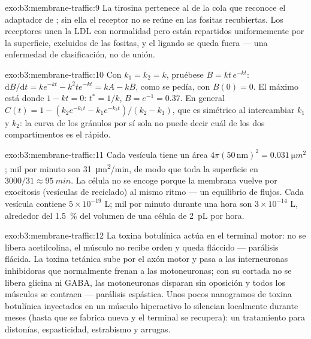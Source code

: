 \begin{solution}{exo:b3:membrane-traffic:9}
La tirosina pertenece al  de la cola que reconoce el adaptador de
; sin ella el receptor no se reúne en las fositas recubiertas.
Los receptores unen la LDL con normalidad pero están repartidos
uniformemente por la superficie, excluidos de las fositas, y el ligando
se queda fuera --- una enfermedad de clasificación, no de unión.
\end{solution}

\begin{solution}{exo:b3:membrane-traffic:10}
Con $k_{1} = k_{2} = k$, pruébese $B = kt\,e^{-kt}$: $\mathrm{d}B/\mathrm{d}t
= k e^{-kt} - k^{2}t e^{-kt} = kA - kB$, como se pedía, con $B(0) = 0$.
El máximo está donde $1 - kt = 0$: $t^{*} = 1/k$, $B = e^{-1} = 0.37$.
En general
$C(t) = 1 - (k_{2}e^{-k_{1}t} - k_{1}e^{-k_{2}t})/(k_{2} - k_{1})$,
que es simétrico al intercambiar $k_{1}$ y $k_{2}$: la curva de
los gránulos por sí sola no puede decir cuál de los dos compartimentos es
el rápido.
\end{solution}

\begin{solution}{exo:b3:membrane-traffic:11}
Cada vesícula tiene un área $4\pi(50\,\text{nm})^{2} = \qty{0.031}{\micro
m^2}$; mil por minuto son \qty{31}{\micro m^2/min}, de modo que toda la
superficie en $3000/31 \approx \qty{95}{min}$. La célula no se encoge
porque la membrana vuelve por exocitosis (vesículas de reciclado) al
mismo ritmo --- un equilibrio de flujos. Cada vesícula contiene
$5\times 10^{-19}$ L; mil por minuto durante una hora son
$3\times 10^{-14}$ L, alrededor del \qty{1.5}{\%} del volumen de una
célula de \qty{2}{pL} por hora.
\end{solution}

\begin{solution}{exo:b3:membrane-traffic:12}
La toxina botulínica actúa en el terminal motor: no se libera
acetilcolina, el músculo no recibe orden y queda fláccido --- parálisis
flácida. La toxina tetánica sube por el axón motor y pasa a las
interneuronas inhibidoras que normalmente frenan a las motoneuronas; con
su  cortada no se libera glicina ni GABA, las motoneuronas disparan
sin oposición y todos los músculos se contraen --- parálisis espástica.
Unos pocos nanogramos de toxina botulínica inyectados en un músculo
hiperactivo lo silencian localmente durante meses (hasta que se fabrica
 nueva y el terminal se recupera): un tratamiento para distonías,
espasticidad, estrabismo y arrugas.
\end{solution}

